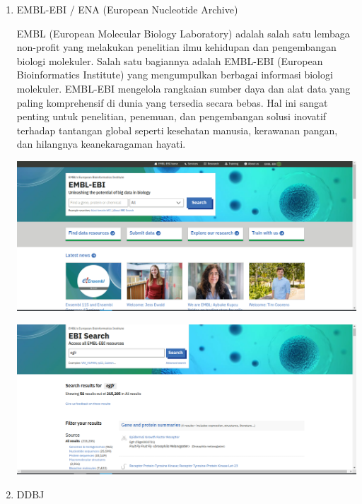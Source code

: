 \documentclass{article}
\begin{document}
\begin{flushleft}
\begin{enumerate}
            \item EMBL-EBI / ENA (European Nucleotide Archive)

            EMBL (European Molecular Biology Laboratory) adalah salah satu lembaga
            non-profit yang melakukan penelitian ilmu kehidupan dan pengembangan biologi
            molekuler. Salah satu bagiannya adalah EMBL-EBI (European Bioinformatics
            Institute) yang mengumpulkan berbagai informasi biologi molekuler. EMBL-EBI mengelola rangkaian sumber daya dan alat data yang paling komprehensif di dunia yang tersedia secara bebas. Hal ini sangat penting untuk penelitian, penemuan, dan pengembangan solusi inovatif terhadap tantangan global seperti kesehatan manusia, kerawanan pangan, dan hilangnya keanekaragaman hayati.
            \par\vspace{0.5cm} 
            \includegraphics[scale=0.3]{Modul1/img/3.png}

            \includegraphics[scale=0.3]{Modul1/img/4.png}

            \item DDBJ


\end{enumerate}
\end{flushleft}
\end{document}
